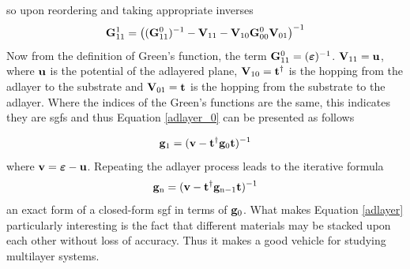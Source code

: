\documentclass[a4paper, 12pt]{article}
\begin{document}
so upon reordering and taking appropriate inverses	
	\begin{equation}\label{adlayer_0}
		{\bf G}_{11}^1=\left(({\bf G}_{11}^0)^{-1}-{\bf V}_{11} -{\bf V}_{10}{\bf G}_{00}^0{\bf V}_{01}\right)^{-1}
	\end{equation}
	Now from the definition of Green's function, the term ${\bf G}_{11}^0 = (\bm\varepsilon)^{-1}$. ${\bf V}_{11} = \bf u$, where $\bf u$ is the potential of the adlayered plane, ${\bf V}_{10}=\bf t^\dagger$ is the hopping from the adlayer to the substrate and ${\bf V}_{01} = \bf t$ is the hopping from the substrate to the adlayer. Where the indices of the Green's functions are the same, this indicates they are \gls{sgf}s and thus Equation \eqref{adlayer_0} can be presented as follows

\begin{equation}
	{\bf g}_1 = ({\bf v-t}^{\dag}{\bf g}_0{\bf t})^{-1}
\end{equation}
where $\bf v = \bm\varepsilon-u$. Repeating the adlayer process leads to the iterative formula
\begin{equation}\label{adlayer}
	\bf{g_{\rm n}} = (\bf{v}-\bf{t}^{\dag}\bf{g_{\rm n-1}t})^{\rm -1}
\end{equation}
an exact form of a closed-form \gls{sgf} in terms of ${\bf g}_0$. What makes Equation \eqref{adlayer} particularly interesting is the fact that different materials may be stacked upon each other without loss of accuracy. Thus it makes a good vehicle for studying multilayer systems.
\end{document}
